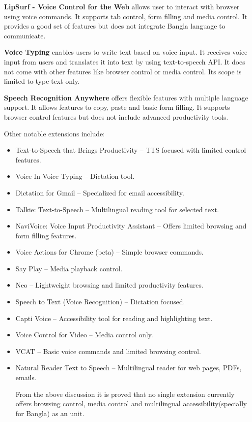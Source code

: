 	\textbf{LipSurf - Voice Control for the Web\cite{lipsurf}} allows user to interact with browser using voice commands. It supports tab control, form filling and media control. It provides a good set of features but does not integrate Bangla language to communicate.
    
	\textbf{Voice Typing\cite{voicetyping}} enables users to write text based on voice input. It receives voice input from users and translates it into text by using text-to-speech API. It does not come with other features like browser control or media control. Its scope is limited to type text only.
	
	\textbf{Speech Recognition Anywhere\cite{speechrec}} offers flexible features with multiple language support. It allows features to copy, paste and basic form filling. It supports browser control features but does not include advanced productivity tools. 
	
	Other notable extensions include: 
	\begin{itemize}
		\item	Text-to-Speech that Brings Productivity\cite{texttospeechprod} – TTS focused with limited control features.
		\item	Voice In Voice Typing\cite{voicein} – Dictation tool.
		\item	Dictation for Gmail\cite{dictationgmail} – Specialized for email accessibility. 
		\item	Talkie: Text-to-Speech\cite{talkie} – Multilingual reading tool for selected text.
		\item	NaviVoice: Voice Input Productivity Assistant\cite{navivoice} – Offers limited browsing and form filling features.
		\item	Voice Actions for Chrome (beta)\cite{voiceactions} – Simple browser commands.
		\item	Say Play\cite{sayplay} – Media playback control.
		\item	Neo\cite{neo} – Lightweight browsing and limited productivity features.
		\item	Speech to Text (Voice Recognition)\cite{speechtext} – Dictation focused.
		\item	Capti Voice\cite{captivoice} – Accessibility tool for reading and highlighting text.
		\item	Voice Control for Video\cite{voicecontrolvideo} – Media control only.
		\item	VCAT\cite{vcat} – Basic voice commands and limited browsing control.
		\item	Natural Reader Text to Speech\cite{naturalreader} – Multilingual reader for web pages, PDFs, emails.
		
        From the above discussion it is proved that no single extension currently offers browsing control, media control and multilingual accessibility(specially for Bangla) as an unit.
		
	\end{itemize}
